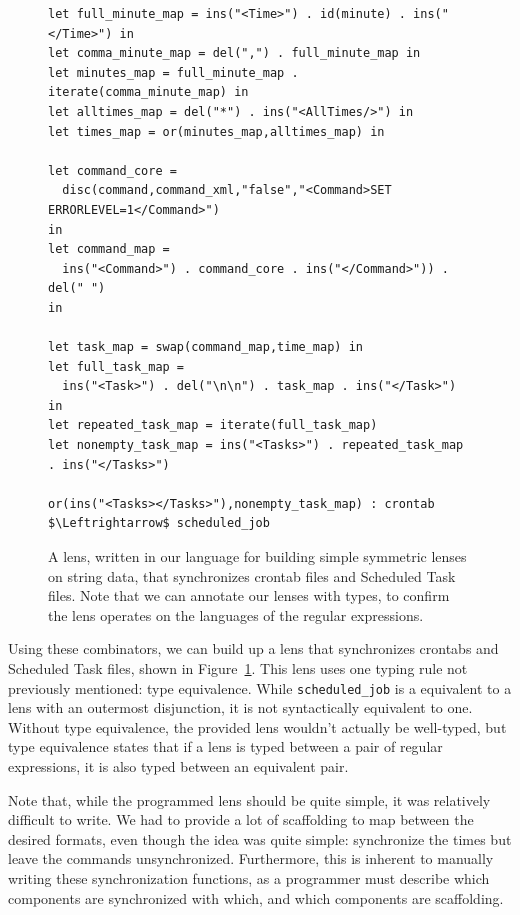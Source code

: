 \documentclass[acmsmall,screen,anonymous]{acmart}
\begin{document}
\begin{figure}
\begin{lstlisting}
let full_minute_map = ins("<Time>") . id(minute) . ins("</Time>") in
let comma_minute_map = del(",") . full_minute_map in
let minutes_map = full_minute_map . iterate(comma_minute_map) in
let alltimes_map = del("*") . ins("<AllTimes/>") in
let times_map = or(minutes_map,alltimes_map) in

let command_core = 
  disc(command,command_xml,"false","<Command>SET ERRORLEVEL=1</Command>")
in
let command_map = 
  ins("<Command>") . command_core . ins("</Command>")) . del(" ") 
in

let task_map = swap(command_map,time_map) in
let full_task_map = 
  ins("<Task>") . del("\n\n") . task_map . ins("</Task>") 
in
let repeated_task_map = iterate(full_task_map)
let nonempty_task_map = ins("<Tasks>") . repeated_task_map . ins("</Tasks>")

or(ins("<Tasks></Tasks>"),nonempty_task_map) : crontab $\Leftrightarrow$ scheduled_job
\end{lstlisting}
  \caption{A lens, written in our language for building simple symmetric lenses
    on string data, that synchronizes crontab files and Scheduled Task files.
    Note that we can annotate our lenses with types, to confirm the lens
    operates on the languages of the regular expressions.}
  \label{fig:example_lens}
\end{figure}

Using these combinators, we can build up a lens that synchronizes crontabs and
Scheduled Task files, shown in Figure~\ref{fig:example_lens}. This lens uses one
typing rule not previously mentioned: type equivalence.  While
\lstinline{scheduled_job} is a equivalent to a lens with an outermost
disjunction, it is not syntactically equivalent to one.  Without type
equivalence, the provided lens wouldn't actually be well-typed, but type
equivalence states that if a lens is typed between a pair of regular
expressions, it is also typed between an equivalent pair.

Note that, while the programmed lens should be quite simple, it was relatively
difficult to write. We had to provide a lot of scaffolding to map between the
desired formats, even though the idea was quite simple: synchronize the times
but leave the commands unsynchronized. Furthermore, this is inherent to manually
writing these synchronization functions, as a programmer must describe which
components are synchronized with which, and which components are scaffolding.
\end{document}
